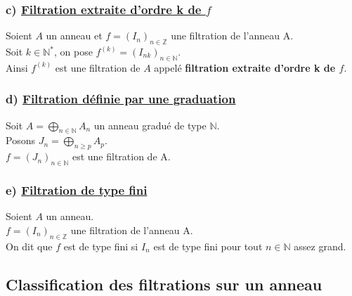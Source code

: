 \subsubsection{c) \underline{Filtration extraite d'ordre k de $f$}}
\begin{madefinition}
	Soient $A$ un anneau et $f = (I_n)_{n\in \mathbb{Z}}$ une filtration de l'anneau A.\\
	Soit $k \in \mathbb{N}^{*}$, on pose $f^{(k)} = (I_{nk})_{n\in \mathbb{N}}$.\\ 
	Ainsi $f^{(k)}$ est une filtration de $A$ appelé \textbf{filtration extraite d'ordre k de $f$}.
\end{madefinition}

\subsubsection{d) \underline{Filtration définie par une graduation}}
\begin{madefinition}
	Soit $A = \displaystyle \bigoplus_{n \in \mathbb{N}}{A_n}$ un anneau gradué de type $\mathbb{N}$.\\ Posons $J_n = \displaystyle \bigoplus_{n \geqslant p }{A_p}$.\\
	$f=(J_n)_{n \in \mathbb{N}}$ est une filtration de A. 
\end{madefinition}
\subsubsection{e) \underline{Filtration de type fini}}
\begin{madefinition}
	Soient $A$ un anneau.\\
	$f = (I_n)_{n\in \mathbb{Z}}$ une filtration de l'anneau A.\\
	On dit que $f$ est de type fini si $I_n$ est de type fini pour tout $n \in \mathbb{N}$ assez grand.
\end{madefinition}

\subsection{Classification des filtrations sur un anneau}
